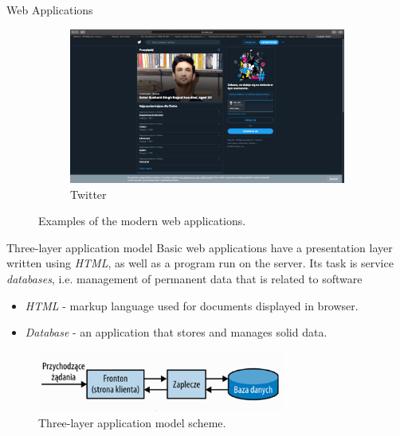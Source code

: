 \documentclass{beamer}
\begin{document}
\begin{frame}{Web Applications}
\begin{figure}[h!]
\begin{subfigure}[b]{0.3\linewidth}
    			\includegraphics[width=\linewidth]{pictures/twitter}
    			\caption{Twitter}
  			\end{subfigure}
  				\caption{Examples of the modern web applications.}
  				\label{fig:coffee}
		\end{figure}
	\end{frame}
	
	\begin{frame}{Three-layer application model}
		Basic web applications have a presentation layer written using \textit{HTML}, as well as a program run on the server. Its task is service \textit{databases}, i.e. management of permanent data that is related to software
		
		\begin{itemize}
  			\item \textit{HTML} - markup language used for documents displayed in browser.
  			\item \textit{Database} - an application that stores and manages solid data.
		\end{itemize}
		
		\begin{figure}[h!]
			\centering
			\includegraphics[height=2cm]{Pictures/architektura_trojwarstwowa}
			\caption{Three-layer application model scheme.}	
			\label{fig:architekturaTroj}
		\end{figure}

	\end{frame}
		
\end{document}
